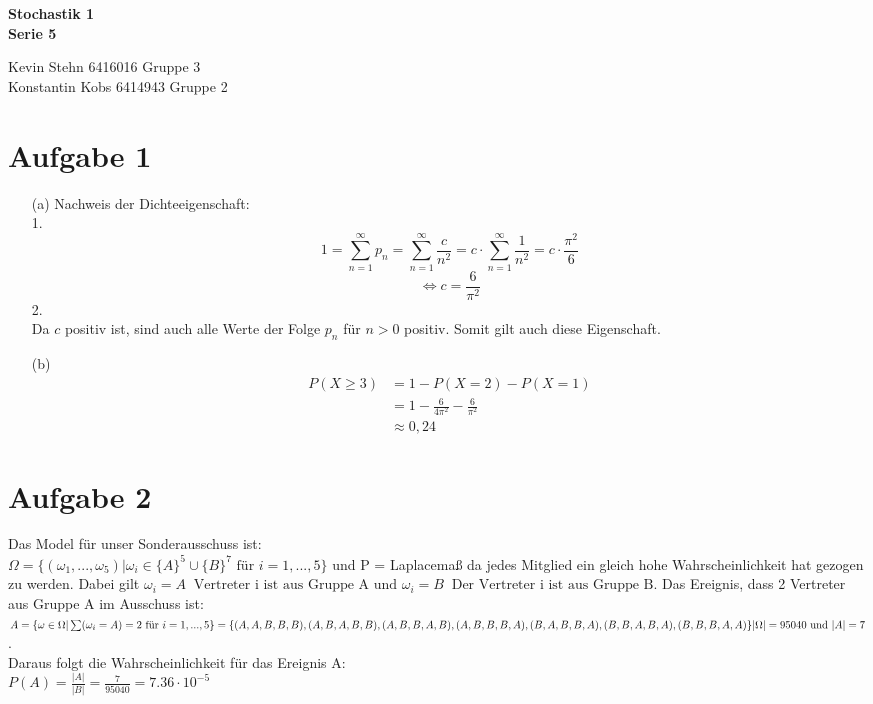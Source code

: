 \documentclass[10pt,a4paper]{article}
\newcommand{\ent}{\mathop{\widehat{=}}}
\begin{document}
\begin{center}
\textbf{Stochastik 1 \\ Serie 5 \\}
\end{center}

\begin{flushright}
Kevin Stehn 6416016 Gruppe 3 \\
Konstantin Kobs 6414943 Gruppe 2
\end{flushright}

\section*{Aufgabe 1}
\begin{itemize}
\item[(a)]Nachweis der Dichteeigenschaft:\\
1.
$$1 = \sum_{n=1}^\infty p_n = \sum_{n=1}^\infty \frac{c}{n^2} = c \cdot \sum_{n=1}^\infty \frac{1}{n^2} = c \cdot \frac{\pi^2}{6}$$
$$\Leftrightarrow c = \frac{6}{\pi^2}$$
2.\\
Da $c$ positiv ist, sind auch alle Werte der Folge $p_n$ für $n > 0$ positiv. Somit gilt auch diese Eigenschaft.
\item[(b)]
\begin{align*}
P(X \geq 3) &= 1 - P(X = 2) - P(X = 1)\\
&= 1 - \frac{6}{4\pi^2} - \frac{6}{\pi^2}\\
&\approx 0,24
\end{align*}
\end{itemize}

\section*{Aufgabe 2}
Das Model für unser Sonderausschuss ist:\\
$\Omega = \{ (\omega_1,...,\omega_5) | \omega_i \in \{A\}^5 \cup \{B\}^7 \text{ f\"ur } i= 1,...,5 \}$ und P = Laplacemaß da jedes Mitglied ein gleich hohe Wahrscheinlichkeit hat gezogen zu werden. Dabei gilt $\omega_i = A \ent \text{Vertreter i ist aus Gruppe A und } \omega_i = B \ent \text{Der Vertreter i ist aus Gruppe B}$.
Das Ereignis, dass 2 Vertreter aus Gruppe A im Ausschuss ist:\\
$A = \{\omega \in \Omega | \sum(\omega_i = A) = 2 \text{ f\"ur } i = 1,...,5\} =\newline \{(A,A,B,B,B),(A,B,A,B,B),(A,B,B,A,B),(A,B,B,B,A),\newline(B,A,B,B,A),(B,B,A,B,A),(B,B,B,A,A) \} \newline
|\Omega| = 95040 \text{ und  } |A| = 7$. \\
Daraus folgt die Wahrscheinlichkeit für das Ereignis A:\\
$P(A) = \frac{|A|}{|B|} = \frac{7}{95040} = 7.36 \cdot 10^{-5}$
\end{document}
